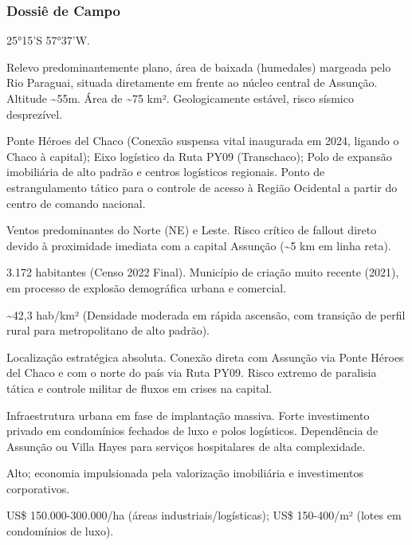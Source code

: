 \subsubsection{Dossiê de Campo}
\begin{description}[style=nextline,leftmargin=0.5cm,font=\bfseries]
\item[Coordenadas]  25°15'S 57°37'W.
\item[Topografia]  Relevo predominantemente plano, área de baixada (humedales) margeada pelo Rio Paraguai, situada diretamente em frente ao núcleo central de Assunção. Altitude \textasciitilde 55m. Área de \textasciitilde 75 km². Geologicamente estável, risco sísmico desprezível.
\item[Alvos Estratégicos]  Ponte Héroes del Chaco (Conexão suspensa vital inaugurada em 2024, ligando o Chaco à capital); Eixo logístico da Ruta PY09 (Transchaco); Polo de expansão imobiliária de alto padrão e centros logísticos regionais. Ponto de estrangulamento tático para o controle de acesso à Região Ocidental a partir do centro de comando nacional.
\item[Fallout]  Ventos predominantes do Norte (NE) e Leste. Risco crítico de fallout direto devido à proximidade imediata com a capital Assunção (\textasciitilde 5 km em linha reta).
\item[População]  3.172 habitantes (Censo 2022 Final). Município de criação muito recente (2021), em processo de explosão demográfica urbana e comercial.
\item[Densidade]  \textasciitilde 42,3 hab/\allowbreak km² (Densidade moderada em rápida ascensão, com transição de perfil rural para metropolitano de alto padrão).
\item[Vias de Acesso]  Localização estratégica absoluta. Conexão direta com Assunção via Ponte Héroes del Chaco e com o norte do país via Ruta PY09. Risco extremo de paralisia tática e controle militar de fluxos em crises na capital.
\item[Serviços]  Infraestrutura urbana em fase de implantação massiva. Forte investimento privado em condomínios fechados de luxo e polos logísticos. Dependência de Assunção ou Villa Hayes para serviços hospitalares de alta complexidade.
\item[Custo de Vida]  Alto; economia impulsionada pela valorização imobiliária e investimentos corporativos.
\item[Preço da Terra]  US\$ 150.000-300.000/\allowbreak ha (áreas industriais/\allowbreak logísticas); US\$ 150-400/\allowbreak m² (lotes em condomínios de luxo).

\end{description}
